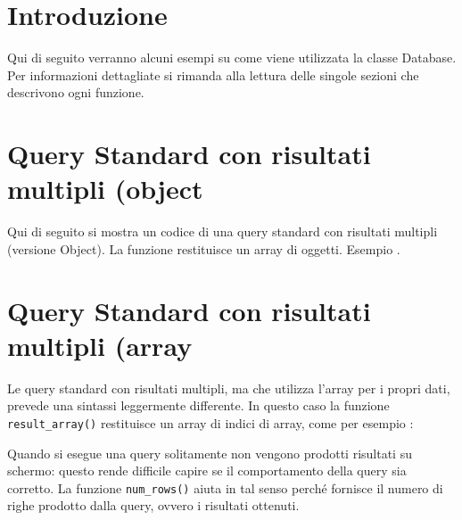 \section*{Introduzione}
Qui di seguito verranno alcuni esempi su come viene utilizzata la classe Database. Per informazioni dettagliate si rimanda alla lettura delle singole sezioni che descrivono ogni funzione.

\section*{Query Standard con risultati multipli (object}
Qui di seguito si mostra un codice di una query standard con risultati multipli (versione Object). La funzione  restituisce un array di oggetti. Esempio .


\section*{Query Standard con risultati multipli (array}
Le query standard con risultati multipli, ma che utilizza l'array per i propri dati, prevede una sintassi leggermente differente. In questo caso la funzione \verb|result_array()| restituisce un array di indici di array, come per esempio :


Quando si esegue una query solitamente non vengono prodotti risultati su schermo: questo rende difficile capire se il comportamento della query sia corretto. La funzione \verb|num_rows()| aiuta in tal senso perché fornisce il numero di righe prodotto dalla query, ovvero i risultati ottenuti.


